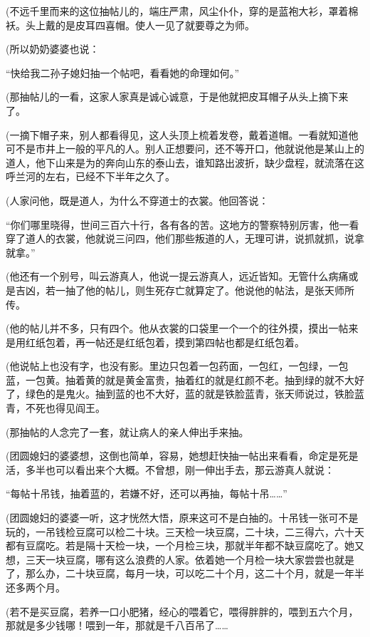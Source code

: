\par (不远千里而来的这位抽帖儿的，端庄严肃，风尘仆仆，穿的是蓝袍大衫，罩着棉袄。头上戴的是皮耳四喜帽。使人一见了就要尊之为师。
\par (所以奶奶婆婆也说：
\par “快给我二孙子媳妇抽一个帖吧，看看她的命理如何。”
\par (那抽帖儿的一看，这家人家真是诚心诚意，于是他就把皮耳帽子从头上摘下来了。
\par (一摘下帽子来，别人都看得见，这人头顶上梳着发卷，戴着道帽。一看就知道他可不是市井上一般的平凡的人。别人正想要问，还不等开口，他就说他是某山上的道人，他下山来是为的奔向山东的泰山去，谁知路出波折，缺少盘程，就流落在这呼兰河的左右，已经不下半年之久了。
\par (人家问他，既是道人，为什么不穿道士的衣裳。他回答说：
\par “你们哪里晓得，世间三百六十行，各有各的苦。这地方的警察特别厉害，他一看穿了道人的衣裳，他就说三问四，他们那些叛道的人，无理可讲，说抓就抓，说拿就拿。”
\par (他还有一个别号，叫云游真人，他说一提云游真人，远近皆知。无管什么病痛或是吉凶，若一抽了他的帖儿，则生死存亡就算定了。他说他的帖法，是张天师所传。
\par (他的帖儿并不多，只有四个。他从衣裳的口袋里一个一个的往外摸，摸出一帖来是用红纸包着，再一帖还是红纸包着，摸到第四帖也都是红纸包着。
\par (他说帖上也没有字，也没有影。里边只包着一包药面，一包红，一包绿，一包蓝，一包黄。抽着黄的就是黄金富贵，抽着红的就是红颜不老。抽到绿的就不大好了，绿色的是鬼火。抽到蓝的也不大好，蓝的就是铁脸蓝青，张天师说过，铁脸蓝青，不死也得见阎王。
\par (那抽帖的人念完了一套，就让病人的亲人伸出手来抽。
\par (团圆媳妇的婆婆想，这倒也简单，容易，她想赶快抽一帖出来看看，命定是死是活，多半也可以看出来个大概。不曾想，刚一伸出手去，那云游真人就说：
\par “每帖十吊钱，抽着蓝的，若嫌不好，还可以再抽，每帖十吊……”
\par (团圆媳妇的婆婆一听，这才恍然大悟，原来这可不是白抽的。十吊钱一张可不是玩的，一吊钱检豆腐可以检二十块。三天检一块豆腐，二十块，二三得六，六十天都有豆腐吃。若是隔十天检一块，一个月检三块，那就半年都不缺豆腐吃了。她又想，三天一块豆腐，哪有这么浪费的人家。依着她一个月检一块大家尝尝也就是了，那么办，二十块豆腐，每月一块，可以吃二十个月，这二十个月，就是一年半还多两个月。
\par (若不是买豆腐，若养一口小肥猪，经心的喂着它，喂得胖胖的，喂到五六个月，那就是多少钱哪！喂到一年，那就是千八百吊了……
